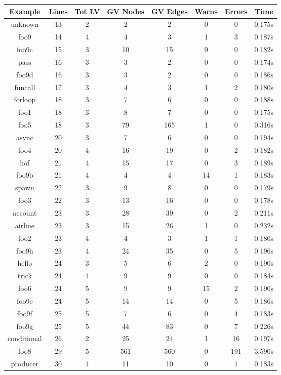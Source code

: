 \begin{table}[!ht]
\centering
\begin{tabular}{|c|c|c|c|c|c|c|c|}
\hline
Example & Lines & Tot LV & GV Nodes & GV Edges & Warns & Errors & Time \\ 
\hline
unknown & 13 & 2 & 2 & 2 & 0 & 0 & 0.175s \\ 
foo9 & 14 & 4 & 4 & 3 & 1 & 3 & 0.187s \\ 
foo9c & 15 & 3 & 10 & 15 & 0 & 0 & 0.182s \\ 
pass & 16 & 3 & 3 & 2 & 0 & 0 & 0.174s \\ 
foo9d & 16 & 3 & 3 & 2 & 0 & 0 & 0.186s \\ 
funcall & 17 & 3 & 4 & 3 & 1 & 2 & 0.180s \\ 
forloop & 18 & 3 & 7 & 6 & 0 & 0 & 0.188s \\ 
foo1 & 18 & 3 & 8 & 7 & 0 & 0 & 0.175s \\ 
foo5 & 18 & 3 & 79 & 165 & 1 & 0 & 0.316s \\ 
async & 20 & 3 & 7 & 6 & 0 & 0 & 0.194s \\ 
foo4 & 20 & 4 & 16 & 19 & 0 & 2 & 0.182s \\ 
hof & 21 & 4 & 15 & 17 & 0 & 3 & 0.189s \\ 
foo9b & 21 & 4 & 4 & 4 & 14 & 1 & 0.183s \\ 
spawn & 22 & 3 & 9 & 8 & 0 & 0 & 0.179s \\ 
foo3 & 22 & 3 & 13 & 16 & 0 & 0 & 0.178s \\ 
account & 23 & 3 & 28 & 39 & 0 & 2 & 0.211s \\ 
airline & 23 & 3 & 15 & 26 & 1 & 0 & 0.232s \\ 
foo2 & 23 & 4 & 4 & 3 & 1 & 1 & 0.180s \\ 
foo9h & 23 & 4 & 24 & 35 & 0 & 5 & 0.196s \\ 
hello & 24 & 3 & 5 & 6 & 2 & 0 & 0.190s \\ 
trick & 24 & 4 & 9 & 9 & 0 & 0 & 0.184s \\ 
foo6 & 24 & 5 & 9 & 9 & 15 & 2 & 0.190s \\ 
foo9e & 24 & 5 & 14 & 14 & 0 & 5 & 0.186s \\ 
foo9f & 25 & 5 & 7 & 6 & 0 & 4 & 0.183s \\ 
foo9g & 25 & 5 & 44 & 83 & 0 & 7 & 0.226s \\ 
conditional & 26 & 2 & 25 & 24 & 1 & 16 & 0.197s \\ 
foo8 & 29 & 5 & 561 & 560 & 0 & 191 & 3.590s \\ 
producer & 30 & 4 & 11 & 10 & 0 & 1 & 0.183s \\ 

\end{tabular}
\end{table}

